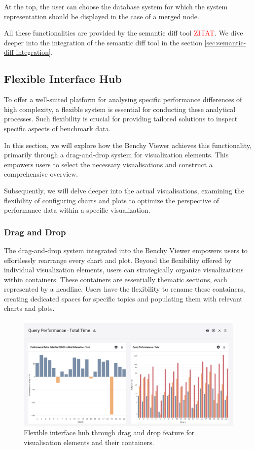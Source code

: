 At the top, the user can choose the database system for which the system representation should be displayed in the case of a merged node.

All these functionalities are provided by the semantic diff tool \textcolor{red}{ZITAT}. We dive deeper into the integration of the semantic diff tool in the section \ref{sec:semantic-diff-integration}.


\subsection{Flexible Interface Hub}

To offer a well-suited platform for analysing specific performance differences of high complexity, a flexible system is essential for conducting these analytical processes. Such flexibility is crucial for providing tailored solutions to inspect specific aspects of benchmark data.

In this section, we will explore how the Benchy Viewer achieves this functionality, primarily through a drag-and-drop system for visualization elements. This empowers users to select the necessary visualisations and construct a comprehensive overview.

Subsequently, we will delve deeper into the actual visualisations, examining the flexibility of configuring charts and plots to optimize the perspective of performance data within a specific visualization.

\subsubsection{Drag and Drop}
The drag-and-drop system integrated into the Benchy Viewer empowers users to effortlessly rearrange every chart and plot. Beyond the flexibility offered by individual visualization elements, users can strategically organize visualizations within containers. These containers are essentially thematic sections, each represented by a headline. Users have the flexibility to rename these containers, creating dedicated spaces for specific topics and populating them with relevant charts and plots.

\begin{figure}[h]
  \centering
  \includegraphics[width=0.8\linewidth]{figures/analytics-drag-and-drop.png}
  \caption{Flexible interface hub through drag and drop feature for visualisation elements and their containers.}
  \label{fig:analytics-drag-and-drop}
\end{figure}

